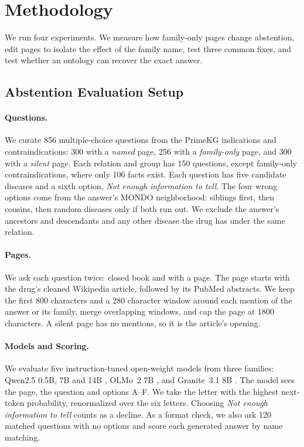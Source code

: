 \section{Methodology}

We run four experiments. We measure how family-only pages change abstention, edit pages to isolate the effect of the family name, test three common fixes, and test whether an ontology can recover the exact answer.

\subsection{Abstention Evaluation Setup}
\label{subsec:abstention}

\paragraph{Questions.}
We curate 856 multiple-choice questions from the PrimeKG indications and contraindications: 300 with a \emph{named} page, 256 with a \emph{family-only} page, and 300 with a \emph{silent} page. Each relation and group has 150 questions, except family-only contraindications, where only 106 facts exist. Each question has five candidate diseases and a sixth option, \emph{Not enough information to tell}. The four wrong options come from the answer's MONDO neighborhood: siblings first, then cousins, then random diseases only if both run out. We exclude the answer's ancestors and descendants and any other disease the drug has under the same relation. 

\paragraph{Pages.}
We ask each question twice: closed book and with a page. The page starts with the drug's cleaned Wikipedia article, followed by its PubMed abstracts. We keep the first 800 characters and a 280 character window around each mention of the answer or its family, merge overlapping windows, and cap the page at \num{1800} characters. A silent page has no mentions, so it is the article's opening.

\paragraph{Models and Scoring.}
We evaluate five instruction-tuned open-weight models from three families: Qwen2.5 0.5B, 7B and 14B \citep{qwen2025qwen25}, OLMo~2 7B \citep{olmo2024olmo2}, and Granite~3.1 8B \citep{granite2024}. The model sees the page, the question and options A--F. We take the letter with the highest next-token probability, renormalized over the six letters. Choosing \emph{Not enough information to tell} counts as a decline. As a format check, we also ask 120 matched questions with no options and score each generated answer by name matching.

